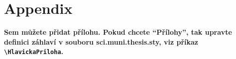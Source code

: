 \chapter*{Appendix}


{\bf Sem můžete přidat přílohu. Pokud chcete ``Přílohy'', tak upravte definici záhlaví v souboru sci.muni.thesis.sty, viz příkaz
\verb+\HlavickaPriloha+.}
\medskip


\shorthandoff{-}\lipsum[50-65]\shorthandon{-}

